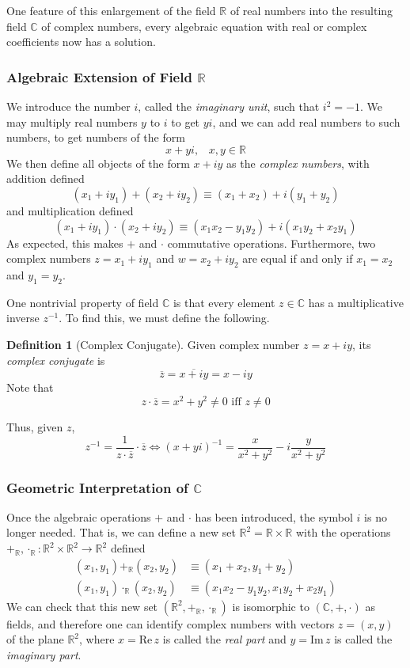 \documentclass{article}
\theoremstyle{remark}
\theoremstyle{definition}
\newtheorem{definition}{Definition}[section]
\begin{document}
One feature of this enlargement of the field $\mathbb{R}$ of real numbers into the resulting field $\mathbb{C}$ of complex numbers, every algebraic equation with real or complex coefficients now has a solution. 

\subsubsection[Algebraic Extension of Field R]{Algebraic Extension of Field $\mathbb{R}$}
We introduce the number $i$, called the \textit{imaginary unit}, such that $i^2 = -1$. We may multiply real numbers $y$ to $i$ to get $yi$, and we can add real numbers to such numbers, to get numbers of the form 
\[x + yi, \;\;\; x, y \in \mathbb{R}\]
We then define all objects of the form $x + iy$ as the \textit{complex numbers}, with addition defined
\[(x_1 + i y_1) + (x_2 + i y_2) \equiv (x_1 + x_2) + i (y_1 + y_2)\]
and multiplication defined
\[(x_1 + i y_1) \cdot (x_2 + i y_2) \equiv (x_1 x_2 - y_1 y_2) + i (x_1 y_2 + x_2 y_1)\]
As expected, this makes $+$ and $\cdot$ commutative operations. Furthermore, two complex numbers $z = x_1 + i y_1$ and $w = x_2 + i y_2$ are equal if and only if $x_1 = x_2$ and $y_1 = y_2$. 

One nontrivial property of field $\mathbb{C}$ is that every element $z \in \mathbb{C}$ has a multiplicative inverse $z^{-1}$. To find this, we must define the following. 

\begin{definition}[Complex Conjugate]
Given complex number $z = x + i y$, its \textit{complex conjugate} is 
\[\overline{z} = \overline{x + iy} = x - iy\]
Note that 
\[z \cdot \overline{z} = x^2 + y^2 \neq 0 \text{ iff } z \neq 0\]
\end{definition}

Thus, given $z$, 
\[z^{-1} = \frac{1}{z \cdot \overline{z}} \cdot \overline{z} \iff (x + yi)^{-1} = \frac{x}{x^2 + y^2} - i \frac{y}{x^2 + y^2}\]

\subsubsection[Geometric Interpretation of C]{Geometric Interpretation of $\mathbb{C}$}
Once the algebraic operations $+$ and $\cdot$ has been introduced, the symbol $i$ is no longer needed. That is, we can define a new set $\mathbb{R}^2 = \mathbb{R} \times \mathbb{R}$ with the operations $+_\mathbb{R}, \cdot_\mathbb{R} : \mathbb{R}^2 \times \mathbb{R}^2 \longrightarrow \mathbb{R}^2$ defined
\begin{align*}
    (x_1, y_1) +_\mathbb{R} (x_2, y_2) & \equiv (x_1 + x_2, y_1 + y_2) \\
    (x_1, y_1) \cdot_\mathbb{R} (x_2, y_2) & \equiv (x_1 x_2 - y_1 y_2, x_1 y_2 + x_2 y_1)
\end{align*}
We can check that this new set $(\mathbb{R}^2, +_\mathbb{R}, \cdot_{\mathbb{R}})$ is isomorphic to $(\mathbb{C}, +, \cdot)$ as fields, and therefore one can identify complex numbers with vectors $z = (x, y)$ of the plane $\mathbb{R}^2$, where $x = \text{Re}\,z$ is called the \textit{real part} and $y = \text{Im}\,z$ is called the \textit{imaginary part}. 
\end{document}
